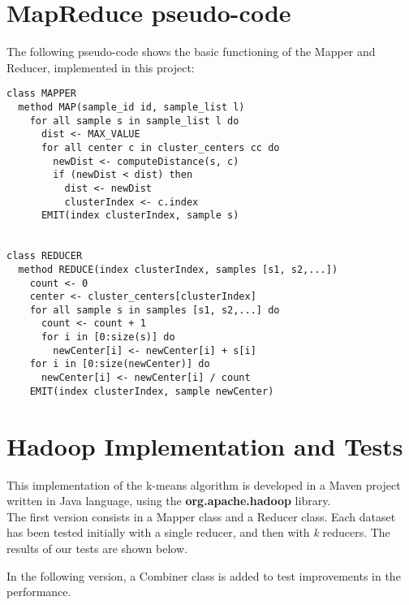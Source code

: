 \documentclass[a4paper, oneside]{article}
\begin{document}
\section{MapReduce pseudo-code}
The following pseudo-code shows the basic functioning of the Mapper and Reducer, implemented in this project:
\begin{verbatim}
class MAPPER
  method MAP(sample_id id, sample_list l)
    for all sample s in sample_list l do
      dist <- MAX_VALUE
      for all center c in cluster_centers cc do
        newDist <- computeDistance(s, c)
        if (newDist < dist) then
          dist <- newDist
          clusterIndex <- c.index
      EMIT(index clusterIndex, sample s)


class REDUCER
  method REDUCE(index clusterIndex, samples [s1, s2,...])
    count <- 0
    center <- cluster_centers[clusterIndex]
    for all sample s in samples [s1, s2,...] do
      count <- count + 1
      for i in [0:size(s)] do
        newCenter[i] <- newCenter[i] + s[i]
    for i in [0:size(newCenter)] do
      newCenter[i] <- newCenter[i] / count
    EMIT(index clusterIndex, sample newCenter)
\end{verbatim}

\section{Hadoop Implementation and Tests}
This implementation of the k-means algorithm is developed in a Maven project written in Java language, using the \textbf{org.apache.hadoop} library.\\

The first version consists in a Mapper class and a Reducer class.
Each dataset has been tested initially with a single reducer, and then with \textit{k} reducers. 
The results of our tests are shown below.


In the following version, a Combiner class is added to test improvements in the performance.

\end{document}
